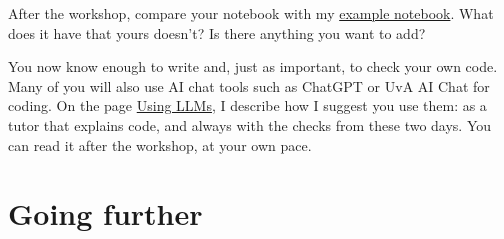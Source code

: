 \documentclass[
  letterpaper,
  DIV=11,
  numbers=noendperiod]{scrreprt}
\begin{document}
After the workshop, compare your notebook with my
\href{example_doc.qmd}{example notebook}. What does it have that yours
doesn't? Is there anything you want to add?

You now know enough to write and, just as important, to check your own
code. Many of you will also use AI chat tools such as ChatGPT or UvA AI
Chat for coding. On the page \href{llm_usage.qmd}{Using LLMs}, I
describe how I suggest you use them: as a tutor that explains code, and
always with the checks from these two days. You can read it after the
workshop, at your own pace.

\section{Going further}\label{going-further}
\end{document}
